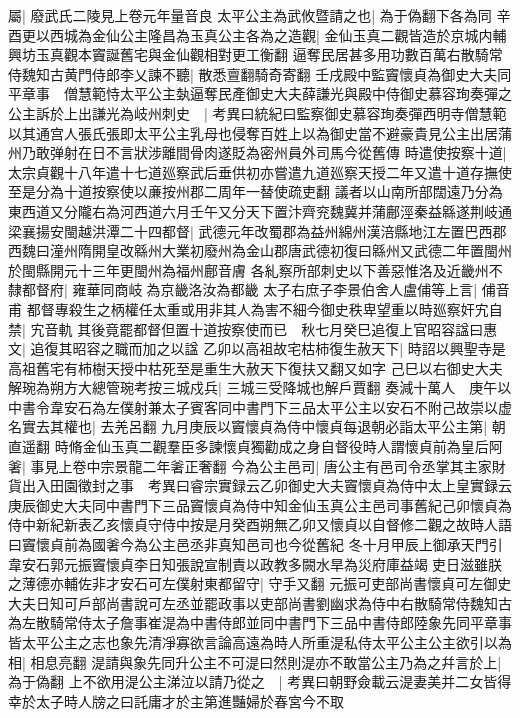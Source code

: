 屬|{
	廢武氏二陵見上卷元年量音良}
太平公主為武攸暨請之也|{
	為于偽翻下各為同}
辛酉更以西城為金仙公主隆昌為玉真公主各為之造觀|{
	金仙玉真二觀皆造於京城内輔興坊玉真觀本竇誕舊宅與金仙觀相對更工衡翻}
逼奪民居甚多用功數百萬右散騎常侍魏知古黄門侍郎李乂諫不聽|{
	散悉亶翻騎奇寄翻}
壬戌殿中監竇懷貞為御史大夫同平章事　僧慧範恃太平公主埶逼奪民產御史大夫薛謙光與殿中侍御史慕容珣奏彈之公主訴於上出謙光為岐州刺史　|{
	考異曰統紀曰監察御史慕容珣奏彈西明寺僧慧範以其通宫人張氏張即太平公主乳母也侵奪百姓上以為御史當不避豪貴見公主出居蒲州乃敢弹射在日不言狀涉離間骨肉遂貶為密州員外司馬今從舊傳}
時遣使按察十道|{
	太宗貞觀十八年遣十七道廵察武后垂供初亦嘗遣九道廵察天授二年又遣十道存撫使至是分為十道按察使以亷按州郡二周年一替使疏吏翻}
議者以山南所部闊遠乃分為東西道又分隴右為河西道六月壬午又分天下置汴齊兖魏冀并蒲鄜涇秦益緜遂荆岐通梁襄揚安閩越洪潭二十四都督|{
	武德元年改蜀郡為益州綿州漢涪縣地江左置巴西郡西魏曰潼州隋開皇改緜州大業初廢州為金山郡唐武德初復曰緜州又武德二年置閩州於閩縣開元十三年更閩州為福州鄜音膚}
各糺察所部刺史以下善惡惟洛及近畿州不隸都督府|{
	雍華同商岐為京畿洛汝為都畿}
太子右庶子李景伯舍人盧俌等上言|{
	俌音甫}
都督專殺生之柄權任太重或用非其人為害不細今御史秩卑望重以時廵察奸宄自禁|{
	宄音軌}
其後竟罷都督但置十道按察使而已　秋七月癸巳追復上官昭容諡曰惠文|{
	追復其昭容之職而加之以諡}
乙卯以高祖故宅枯柿復生赦天下|{
	時詔以興聖寺是高祖舊宅有柿樹天授中枯死至是重生大赦天下復扶又翻又如字}
己巳以右御史大夫解琬為朔方大總管琬考按三城戍兵|{
	三城三受降城也解戶賈翻}
奏減十萬人　庚午以中書令韋安石為左僕射兼太子賓客同中書門下三品太平公主以安石不附己故崇以虚名實去其權也|{
	去羌呂翻}
九月庚辰以竇懷貞為侍中懷貞每退朝必詣太平公主第|{
	朝直遥翻}
時脩金仙玉真二觀羣臣多諫懷貞獨勸成之身自督役時人謂懷貞前為皇后阿㸙|{
	事見上卷中宗景龍二年㸙正奢翻}
今為公主邑司|{
	唐公主有邑司令丞掌其主家財貨出入田園徵封之事　考異曰睿宗實録云乙卯御史大夫竇懷貞為侍中太上皇實録云庚辰御史大夫同中書門下三品竇懷貞為侍中知金仙玉真公主邑司事舊紀己卯懷貞為侍中新紀新表乙亥懷貞守侍中按是月癸酉朔無乙卯又懷貞以自督修二觀之故時人語曰竇懷貞前為國㸙今為公主邑丞非真知邑司也今從舊紀}
冬十月甲辰上御承天門引韋安石郭元振竇懷貞李日知張說宣制責以政教多闕水旱為災府庫益竭吏日滋雖朕之薄德亦輔佐非才安石可左僕射東都留守|{
	守手又翻}
元振可吏部尚書懷貞可左御史大夫日知可戶部尚書說可左丞並罷政事以吏部尚書劉幽求為侍中右散騎常侍魏知古為左散騎常侍太子詹事崔湜為中書侍郎並同中書門下三品中書侍郎陸象先同平章事皆太平公主之志也象先清凈寡欲言論高遠為時人所重湜私侍太平公主公主欲引以為相|{
	相息亮翻}
湜請與象先同升公主不可湜曰然則湜亦不敢當公主乃為之幷言於上|{
	為于偽翻}
上不欲用湜公主涕泣以請乃從之　|{
	考異曰朝野僉載云湜妻美并二女皆得幸於太子時人牓之曰託庸才於主第進豔婦於春宮今不取}
